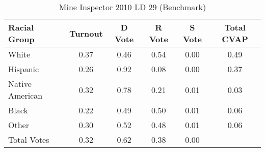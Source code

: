 \begin{table}[htb]
\begin{center}
\caption{Mine Inspector 2010 LD 29 (Benchmark)}
\label{smine_cvap_ld_29_benchmark}
\begin{tabular}{lccccc}
  \hline
Racial Group & Turnout & D Vote & R Vote & S Vote & Total CVAP \\ 
  \hline
White & 0.37 & 0.46 & 0.54 & 0.00 & 0.49 \\ 
  Hispanic & 0.26 & 0.92 & 0.08 & 0.00 & 0.37 \\ 
  Native American & 0.32 & 0.78 & 0.21 & 0.01 & 0.03 \\ 
  Black & 0.22 & 0.49 & 0.50 & 0.01 & 0.06 \\ 
  Other & 0.30 & 0.52 & 0.48 & 0.01 & 0.06 \\ 
  Total Votes & 0.32 & 0.62 & 0.38 & 0.00 &  \\ 
   \hline
\end{tabular}
\end{center}
\end{table}
